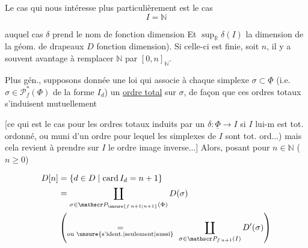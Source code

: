 


Le cas qui nous intéresse plus particulièrement est le cas
\[
 I=\mathbb N
\]

auquel cas $\delta$ prend le nom de fonction dimension  Et $\sup_{\overline{\mathbb R}}\delta(I)$  la dimension de la géom. de drapeaux $D$  fonction dimension). Si celle-ci est finie, soit $n$, il y a souvent avantage à remplacer $\mathbb N$ par $[0,n]_{\mathbb N}$.

Plus gén.,  supposons donnée une loi qui associe à chaque  simplexe $\sigma\subset\underline{\Phi}$ (i.e. $\sigma\in\mathscr P_f^*(\Phi)$ de la forme $I_d$) un \uline{ordre total} sur $\sigma$, de façon que ces ordres totaux s'induisent mutuellement

[ce qui est le cas pour les ordres totaux induits par un $\delta:\underline{\Phi}\to I$ si $I$ lui-m est tot. ordonné, ou muni d'un ordre  pour lequel les simplexes de $I$ sont tot. ord...) mais cela revient à prendre sur $I$ le ordre image inverse...] Alors, posant pour $n\in\mathbb N$ ($n\geq0$)

\[
 \begin{aligned}
 D[n]&=\{d\in D\mid\operatorname{card}I_d=n+1\}\\
 &=\coprod_{\sigma\in\mathscr P_{\unsure{f\,n+1|n+1}}(\Phi)}D(\sigma)\\
 &\left(\underset{\text{ou \unsure{s'ident.|seulement|aussi}}}{=}\
 \coprod_{\sigma\in\mathscr P_{f\,n+1}(I)}D'(\sigma)\right)
 \end{aligned}
\]

